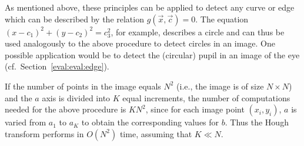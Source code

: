 As mentioned above, these principles can be applied to detect any
curve or edge which can be described by the relation
$g(\vec{x},\vec{c})=0$.  The equation
$(x-c_{1})^{2}+(y-c_{2})^{2}=c_{3}^{2}$, for example, describes a
circle and can thus be used analogously to the above procedure to
detect circles in an image.  One possible application would be to
detect the (circular) pupil in an image of the eye (cf.\
Section~\ref{eval:eval:edge}).

If the number of points in the image equals $N^{2}$ (i.e., the image
is of size $N\times N$) and the $a$ axis is divided into $K$ equal
increments, the number of computations needed for the above procedure
is $KN^{2}$, since for each image point $(x_{i},y_{i})$, $a$ is varied
from $a_{1}$ to $a_{K}$ to obtain the corresponding values for $b$.
Thus the Hough transform performs in $O(N^{2})$ time, assuming that
$K\ll N$.
